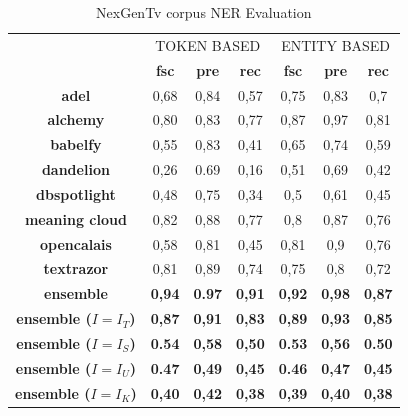 \documentclass{llncs}
\begin{document}
\begin{table}
      \centering
      \setlength{\tabcolsep}{12pt}
      \begin{tabular}{c|c|c|c|c|c|c|}
      \multicolumn{1}{c}{ } &
      \multicolumn{3}{|c|}{TOKEN BASED} & 
      \multicolumn{3}{|c|}{ENTITY BASED} \\
      & \textbf{fsc} &\textbf{pre} & \textbf{rec} 
      & \textbf{fsc} &\textbf{pre} & \textbf{rec} 
      \\ \hline
      \textbf{adel}           & 0,68  & 0,84  & 0,57 & 0,75  & 0,83  & 0,7  \\ \hline
      \textbf{alchemy}        & 0,80  & 0,83  & 0,77 & 0,87  & 0,97  & 0,81 \\ \hline
      \textbf{babelfy}        & 0,55  & 0,83  & 0,41 & 0,65  & 0,74  & 0,59 \\ \hline
      \textbf{dandelion}      & 0,26  & 0.69  & 0,16 & 0,51  & 0,69  & 0,42 \\ \hline
      \textbf{dbspotlight}    & 0,48  & 0,75  & 0,34 & 0,5   & 0,61  & 0,45 \\ \hline
      \textbf{meaning cloud}  & 0,82  & 0,88  & 0,77 & 0,8   & 0,87  & 0,76 \\ \hline
      \textbf{opencalais}     & 0,58  & 0,81  & 0,45 & 0,81  & 0,9   & 0,76 \\ \hline
      \textbf{textrazor}      & 0,81  & 0,89  & 0,74 & 0,75  & 0,8   & 0,72 \\ \hline \hline
      \textbf{ensemble}       & \textbf{0,94}  & \textbf{0.97}  & \textbf{0,91}  & \textbf{0,92} & \textbf{0,98}  & \textbf{0,87} \\ \hline
      \textbf{ensemble ($I=I_T$)}        & \textbf{0,87}   & \textbf{0,91}   & \textbf{0,83}  & \textbf{0,89} & \textbf{0,93}  & \textbf{0,85} \\ \hline
       \textbf{ensemble ($I=I_S$)}        & \textbf{0.54}   & \textbf{0,58}   & \textbf{0,50}  & \textbf{0.53} & \textbf{0,56}  & \textbf{0.50} \\\hline    
       \textbf{ensemble ($I=I_U$)}        & \textbf{0.47}   & \textbf{0,49}   & \textbf{0,45}  & \textbf{0.46} & \textbf{0,47}  & \textbf{0,45} \\\hline
       \textbf{ensemble ($I=I_K$)}        & \textbf{0,40}   & \textbf{0,42}   & \textbf{0,38}  & \textbf{0,39} & \textbf{0,40}  & \textbf{0,38} \\\hline    
      \end{tabular}
    \caption{NexGenTv corpus NER Evaluation}
    \label{typescoresNEXGENTV}

\end{table}
\end{document}
